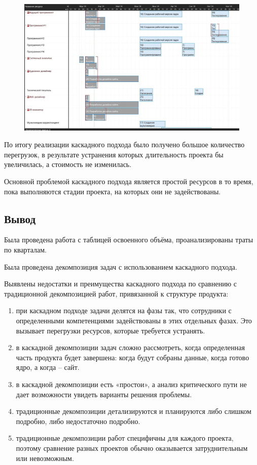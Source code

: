 \begin{figure}[h!]
	\begin{center}
		\includegraphics[scale=0.3]{inc/img/p_19.jpg}
	\end{center}
	\captionsetup{justification=centering}
	\label{fig:u3}
\end{figure}

\newpage

По итогу реализации каскадного подхода было получено большое количество перегрузок, в результате устранения которых длительность проекта бы увеличилась, а стоимость не изменилась. 

Основной проблемой каскадного подхода является простой ресурсов в то время, пока выполняются стадии проекта, на которых они не задействованы.

\subsection*{Вывод}

Была проведена работа с таблицей освоенного объёма, проанализированы траты по кварталам.

Была проведена декомпозиция задач с использованием каскадного подхода. 

Выявлены недостатки и преимущества каскадного подхода по сравнению с традиционной декомпозицией работ, привязанной к структуре продукта:

\begin{enumerate}
    \item при каскадном подходе задачи делятся на фазы так, что сотрудники с определенными компетенциями задействованы в этих отдельных фазах. Это вызывает перегрузки ресурсов, которые требуется устранять. 
    \item в каскадной декомпозиции задач сложно рассмотреть, когда определенная часть продукта будет завершена: когда будут собраны данные, когда готово ядро, а когда – сайт. 
    \item в каскадной декомпозиции есть «простои», а анализ критического пути не дает возможности увидеть варианты решения проблемы.
    \item традиционные декомпозиции детализируются и планируются либо слишком подробно, либо недостаточно подробно.
    \item традиционные декомпозиции работ специфичны для каждого проекта, поэтому сравнение разных проектов обычно оказывается затруднительным или невозможным.
\end{enumerate}

